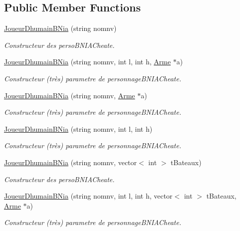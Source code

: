 \subsection*{Public Member Functions}
\begin{DoxyCompactItemize}
\item 
\hyperlink{classJoueurDhumainBNia_ad730ef7ceffa8698f6fe2c98416f97b5}{Joueur\-Dhumain\-B\-Nia} (string nomnv)
\begin{DoxyCompactList}\small\item\em Constructeur des perso\-B\-N\-I\-A\-Cheate. \end{DoxyCompactList}\item 
\hyperlink{classJoueurDhumainBNia_ab4f8d64413468df76801e2920a37c044}{Joueur\-Dhumain\-B\-Nia} (string nomnv, int l, int h, \hyperlink{classArme}{Arme} $\ast$a)
\begin{DoxyCompactList}\small\item\em Constructeur (très) parametre de personnage\-B\-N\-I\-A\-Cheate. \end{DoxyCompactList}\item 
\hyperlink{classJoueurDhumainBNia_a73b6ae86546a811cc79261f1c0112980}{Joueur\-Dhumain\-B\-Nia} (string nomnv, \hyperlink{classArme}{Arme} $\ast$a)
\begin{DoxyCompactList}\small\item\em Constructeur (très) parametre de personnage\-B\-N\-I\-A\-Cheate. \end{DoxyCompactList}\item 
\hyperlink{classJoueurDhumainBNia_a39fce943bb0edaddb1a91f785e041d57}{Joueur\-Dhumain\-B\-Nia} (string nomnv, int l, int h)
\begin{DoxyCompactList}\small\item\em Constructeur (très) parametre de personnage\-B\-N\-I\-A\-Cheate. \end{DoxyCompactList}\item 
\hyperlink{classJoueurDhumainBNia_acf621e354dcb347a01975bdf9d01af41}{Joueur\-Dhumain\-B\-Nia} (string nomnv, vector$<$ int $>$ t\-Bateaux)
\begin{DoxyCompactList}\small\item\em Constructeur des perso\-B\-N\-I\-A\-Cheate. \end{DoxyCompactList}\item 
\hyperlink{classJoueurDhumainBNia_adb64b580310bb67347ada4ac0462d784}{Joueur\-Dhumain\-B\-Nia} (string nomnv, int l, int h, vector$<$ int $>$ t\-Bateaux, \hyperlink{classArme}{Arme} $\ast$a)
\begin{DoxyCompactList}\small\item\em Constructeur (très) parametre de personnage\-B\-N\-I\-A\-Cheate. \end{DoxyCompactList}\item 

\end{DoxyCompactItemize}
